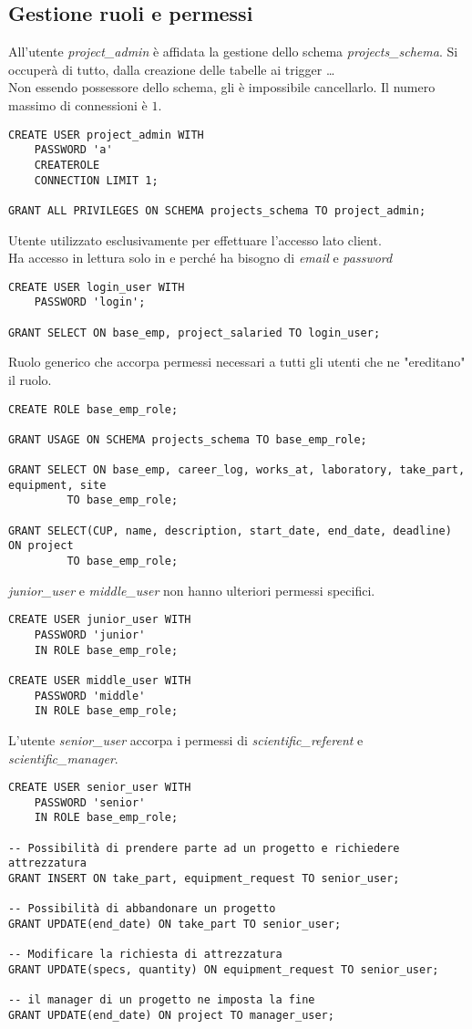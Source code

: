 \subsection{Gestione ruoli e permessi}
All'utente \textit{project\_admin} è affidata la gestione dello schema \textit{projects\_schema}. Si occuperà di tutto, dalla creazione delle tabelle ai trigger \dots\\
Non essendo possessore dello schema, gli è impossibile cancellarlo.\sskip
Il numero massimo di connessioni è $1$.
\begin{lstlisting}
CREATE USER project_admin WITH 
    PASSWORD 'a'
    CREATEROLE
    CONNECTION LIMIT 1;

GRANT ALL PRIVILEGES ON SCHEMA projects_schema TO project_admin;
\end{lstlisting}\medskip
Utente utilizzato esclusivamente per effettuare l'accesso lato client.\\
Ha accesso in lettura solo in \textit{\baseemp} e \textit{\projectsalaried} perché ha bisogno di \textit{email} e \textit{password}
\begin{lstlisting}
CREATE USER login_user WITH
	PASSWORD 'login';

GRANT SELECT ON base_emp, project_salaried TO login_user;
\end{lstlisting}
\newpage \noindent
Ruolo generico che accorpa permessi necessari a tutti gli utenti che ne "ereditano" il ruolo.
\begin{lstlisting}
CREATE ROLE base_emp_role;

GRANT USAGE ON SCHEMA projects_schema TO base_emp_role;

GRANT SELECT ON base_emp, career_log, works_at, laboratory, take_part, equipment, site 
	     TO base_emp_role;

GRANT SELECT(CUP, name, description, start_date, end_date, deadline) ON project 
	     TO base_emp_role;
\end{lstlisting}\medskip
\textit{junior\_user} e \textit{middle\_user} non hanno ulteriori permessi specifici.
\begin{lstlisting}
CREATE USER junior_user WITH 
	PASSWORD 'junior'
	IN ROLE base_emp_role;

CREATE USER middle_user WITH
	PASSWORD 'middle'
	IN ROLE base_emp_role;
\end{lstlisting}\medskip
L'utente \textit{senior\_user} accorpa i permessi di \textit{scientific\_referent} e \textit{scientific\_manager}.
\begin{lstlisting}
CREATE USER senior_user WITH
	PASSWORD 'senior'
	IN ROLE base_emp_role;

-- Possibilità di prendere parte ad un progetto e richiedere attrezzatura
GRANT INSERT ON take_part, equipment_request TO senior_user; 

-- Possibilità di abbandonare un progetto
GRANT UPDATE(end_date) ON take_part TO senior_user;

-- Modificare la richiesta di attrezzatura
GRANT UPDATE(specs, quantity) ON equipment_request TO senior_user;

-- il manager di un progetto ne imposta la fine
GRANT UPDATE(end_date) ON project TO manager_user; 
\end{lstlisting}
